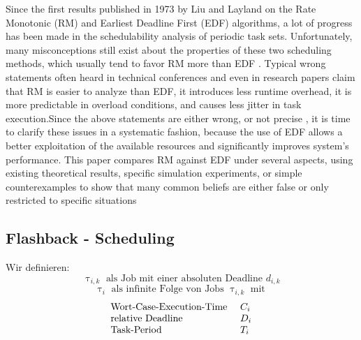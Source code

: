 \begin{frame}{\subsecname}
\tiny Since the first results published in 1973 by Liu and Layland on the Rate Monotonic (RM) and Earliest Deadline First (EDF) algorithms, a lot of progress has been made in the schedulability analysis of periodic task sets. Unfortunately, many \Large misconceptions \tiny still exist about the properties of these two scheduling methods, which usually tend to \Large favor RM more than EDF \tiny. Typical wrong statements often heard in technical conferences and even in research papers claim that RM is easier to analyze than EDF, it introduces less runtime overhead, it is more predictable in overload conditions, and causes less jitter in task execution.Since the above statements are \Large  either wrong, or not precise \tiny, it is time to clarify these issues in a systematic fashion, because the use of EDF allows a better exploitation of the available resources and significantly improves system’s performance. \Large This paper compares RM against EDF \tiny under several aspects, using existing theoretical results, specific simulation experiments, or simple counterexamples to show that many common beliefs are either false or only restricted to specific situations
\end{frame}

	
\subsection{Flashback - Scheduling}
\begin{frame}{\subsecname}
	Wir definieren:
	\begin{equation}
		\uptau_{i, k} \text{ als Job mit einer absoluten Deadline } d_{i, k}
	\end{equation}
	\pause
	\begin{equation}
		\uptau_i \text{ als infinite Folge von Jobs } \uptau_{i, k} \text{ mit }
	\end{equation}
	\pause
	\begin{equation}
		\begin{array}{l l l}
			\text{Wort-Case-Execution-Time } & C_i\\
			\text{relative Deadline } & D_i\\
			\text{Task-Period } & T_i
		\end{array}
	\end{equation}
\end{frame}

